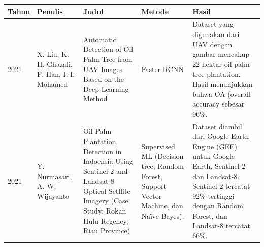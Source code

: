 \begin{singlespace}
	\begin{table}[H]
		\centering
		\begin{tabular}{|p{2cm}|p{2cm}|p{2cm}|p{2cm}|p{2cm}|}	
			\hline
			Tahun & Penulis & Judul & Metode & Hasil \\ \hline
			2021  & X. Liu, K. H. Ghazali, F. Han, I. I. Mohamed                           & Automatic Detection of Oil Palm Tree from UAV Images Based on the Deep Learning Method                                                               & Faster RCNN                                                                                                                                                                     & Dataset yang digunakan dari UAV dengan gambar mencakup 22 hektar oil palm tree plantation. Hasil menunjukkan bahwa OA (overall accuracy sebesar 96\%.                                                                                                                                                             \\ \hline
			2021  & Y. Nurmasari, A. W. Wijayanto                                          & Oil Palm Plantation Detection in Indoensia Using Sentinel-2 and Landsat-8 Optical Setllite Imagery (Case Study: Rokan   Hulu Regency, Riau Province) & Supervised ML (Decision tree, Random Forest, Support Vector Machine, dan Naïve Bayes).                                                                                          & Dataset diambil dari Google Earth Engine   (GEE) untuk Google Earth, Sentinel-2 dan Landsat-8. Sentinel-2 tercatat 92\% tertinggi dengan Random Forest, dan Landsat-8 tercatat 66\%.                                                                                                                              \\ \hline
		\end{tabular}
	\end{table}
\end{singlespace}

